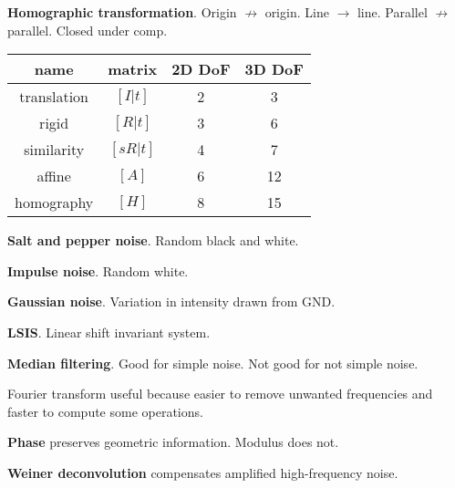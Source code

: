 \documentclass[twocolumn]{zett}
\begin{document}
\begin{node}
  \textbf{Homographic transformation}.
  Origin $\not\to$ origin.
  Line $\to$ line.
  Parallel $\not\to$ parallel.
  Closed under comp.
\end{node}

\begin{node}
  \begin{tabular}{cccc}
    name & matrix & 2D DoF & 3D DoF\\\hline
    translation & $[I | t]$ & 2 & 3\\\hline
    rigid & $[R | t]$ & 3 & 6\\\hline
    similarity & $[sR | t]$ & 4 & 7\\\hline
    affine & $[A]$ & 6 & 12\\\hline
    homography & $[H]$ & 8 & 15\\\hline
  \end{tabular}
\end{node}

\begin{node}
  \textbf{Salt and pepper noise}.
  Random black and white.
\end{node}

\begin{node}
  \textbf{Impulse noise}.
  Random white.
\end{node}

\begin{node}
  \textbf{Gaussian noise}.
  Variation in intensity drawn from GND.
\end{node}

\begin{node}
  \textbf{LSIS}.
  Linear shift invariant system.
\end{node}

\begin{node}
  \textbf{Median filtering}.
  Good for simple noise.
  Not good for not simple noise.
\end{node}

\begin{node}
  Fourier transform useful because easier to remove unwanted frequencies and faster to compute some operations.
\end{node}

\begin{node}
  \textbf{Phase} preserves geometric information.
  Modulus does not.
\end{node}

\begin{node}
  \textbf{Weiner deconvolution} compensates amplified high-frequency noise.
\end{node}
\end{document}
